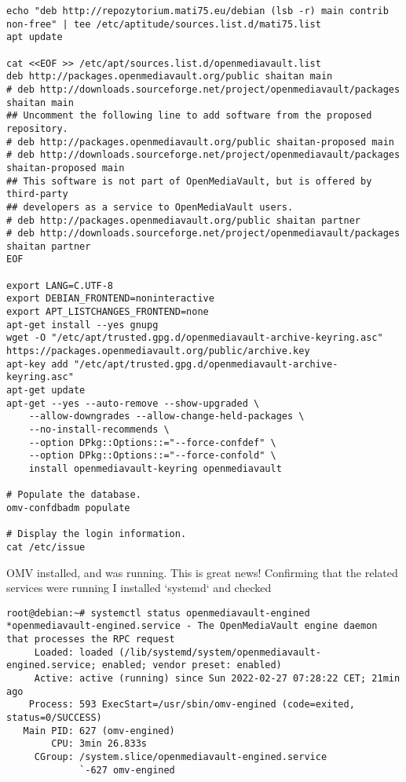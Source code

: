 \documentclass[11pt]{article}
\begin{document}
\begin{verbatim}
echo "deb http://repozytorium.mati75.eu/debian (lsb -r) main contrib non-free" | tee /etc/aptitude/sources.list.d/mati75.list
apt update

cat <<EOF >> /etc/apt/sources.list.d/openmediavault.list
deb http://packages.openmediavault.org/public shaitan main
# deb http://downloads.sourceforge.net/project/openmediavault/packages shaitan main
## Uncomment the following line to add software from the proposed repository.
# deb http://packages.openmediavault.org/public shaitan-proposed main
# deb http://downloads.sourceforge.net/project/openmediavault/packages shaitan-proposed main
## This software is not part of OpenMediaVault, but is offered by third-party
## developers as a service to OpenMediaVault users.
# deb http://packages.openmediavault.org/public shaitan partner
# deb http://downloads.sourceforge.net/project/openmediavault/packages shaitan partner
EOF

export LANG=C.UTF-8
export DEBIAN_FRONTEND=noninteractive
export APT_LISTCHANGES_FRONTEND=none
apt-get install --yes gnupg
wget -O "/etc/apt/trusted.gpg.d/openmediavault-archive-keyring.asc" https://packages.openmediavault.org/public/archive.key
apt-key add "/etc/apt/trusted.gpg.d/openmediavault-archive-keyring.asc"
apt-get update
apt-get --yes --auto-remove --show-upgraded \
    --allow-downgrades --allow-change-held-packages \
    --no-install-recommends \
    --option DPkg::Options::="--force-confdef" \
    --option DPkg::Options::="--force-confold" \
    install openmediavault-keyring openmediavault

# Populate the database.
omv-confdbadm populate

# Display the login information.
cat /etc/issue
\end{verbatim}

OMV  installed,  and  was   running.  This  is  great  news!
Confirming  that   the  related  services  were   running  I
installed `systemd` and checked

\begin{verbatim}
root@debian:~# systemctl status openmediavault-engined
*openmediavault-engined.service - The OpenMediaVault engine daemon that processes the RPC request
     Loaded: loaded (/lib/systemd/system/openmediavault-engined.service; enabled; vendor preset: enabled)
     Active: active (running) since Sun 2022-02-27 07:28:22 CET; 21min ago
    Process: 593 ExecStart=/usr/sbin/omv-engined (code=exited, status=0/SUCCESS)
   Main PID: 627 (omv-engined)
        CPU: 3min 26.833s
     CGroup: /system.slice/openmediavault-engined.service
             `-627 omv-engined
\end{verbatim}
\end{document}
